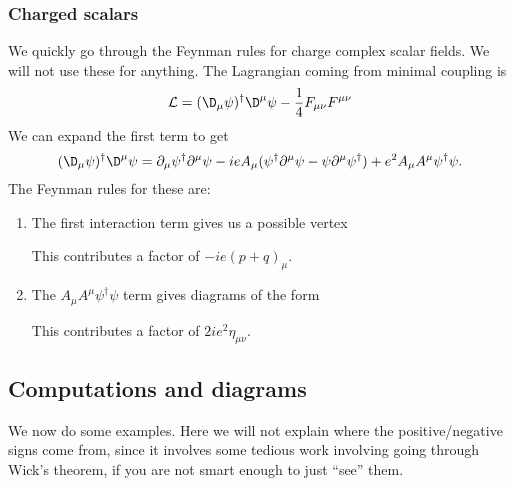 \documentclass[a4paper]{article}
\begin{document}
\subsubsection*{Charged scalars}
We quickly go through the Feynman rules for charge complex scalar fields. We will not use these for anything. The Lagrangian coming from minimal coupling is
\[
  \mathcal{L} = (\D_\mu \psi)^\dagger \D^\mu \psi - \frac{1}{4} F_{\mu\nu}F^{\mu\nu}
\]
We can expand the first term to get
\[
  (\D_\mu \psi)^\dagger \D^\mu \psi = \partial_\mu \psi^\dagger \partial^\mu \psi - ie A_\mu(\psi^\dagger \partial^\mu \psi - \psi \partial^\mu \psi^\dagger) + e^2 A_\mu A^\mu \psi^\dagger \psi.
\]
The Feynman rules for these are:
\begin{enumerate}
  \item The first interaction term gives us a possible vertex
    \begin{center}
    \end{center}
    This contributes a factor of $-ie(p + q)_\mu$.
  \item The $A_\mu A^\mu \psi^\dagger \psi$ term gives diagrams of the form
    \begin{center}
    \end{center}
    This contributes a factor of $2ie^2 \eta_{\mu\nu}$.
\end{enumerate}

\subsection{Computations and diagrams}
We now do some examples. Here we will not explain where the positive/negative signs come from, since it involves some tedious work involving going through Wick's theorem, if you are not smart enough to just ``see'' them.
\end{document}
